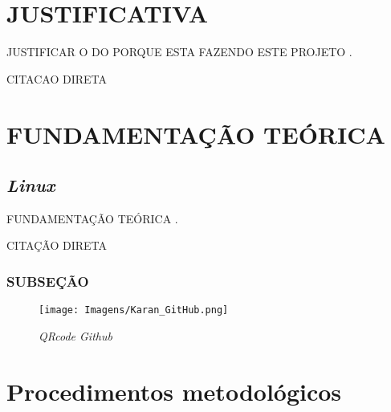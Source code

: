 \documentclass{pre-project}
\begin{document}
\chapter{JUSTIFICATIVA}
JUSTIFICAR O DO PORQUE ESTA FAZENDO ESTE PROJETO \cite{mota2012descobrindo}.

		\begin{citacao}
			CITACAO DIRETA
		\end{citacao}


\chapter{FUNDAMENTAÇÃO TEÓRICA}
	\section{\textit{Linux}}
	
	FUNDAMENTAÇÃO TEÓRICA \cite{nomenacitacao}.
	
	
	
		\begin{citacao}
		CITAÇÃO DIRETA
		\end{citacao}
	
	
		\subsection{SUBSEÇÃO}
		
			\begin{figure*}[h]
			\caption{\label{Debian}\textit{QRcode Github}}
			\centering
			{\texttt{[image: Imagens/Karan\_GitHub.png]}}
			\end{figure*}
	

	
\chapter{Procedimentos metodológicos}
	
	
\end{document}
